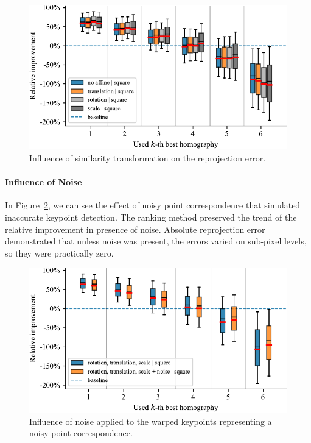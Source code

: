 \begin{figure}[t]
    \centering
    \includegraphics[width=\boxplotimgwidth]{figures/homography/similarity_transform_influence.pdf}
    \caption{Influence of similarity transformation on the reprojection error.}
    \label{fig:SimilarityTransformInfluence}
\end{figure}

\paragraph{Influence of Noise}
In Figure~\ref{fig:NoiseInfluence}, we can see the effect of noisy point correspondence that simulated inaccurate keypoint detection. The ranking method preserved the trend of the relative improvement in presence of noise. Absolute reprojection error demonstrated that unless noise was present, the errors varied on sub-pixel levels, so they were practically zero.

\begin{figure}[t]
    \centering
    \includegraphics[width=\boxplotimgwidth]{figures/homography/noise_influence.pdf}
    \caption{Influence of noise applied to the warped keypoints representing a noisy point correspondence.}
    \label{fig:NoiseInfluence}
\end{figure}

